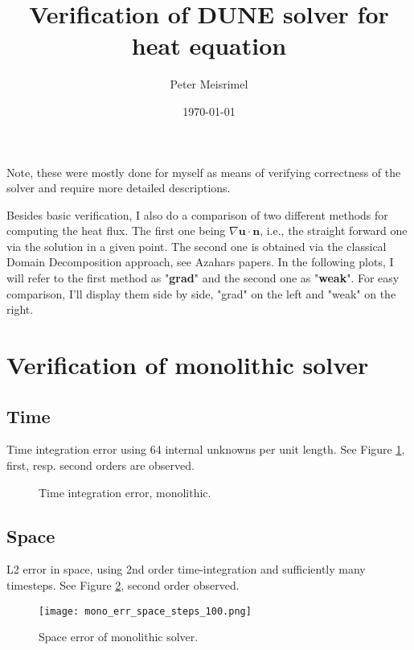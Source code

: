 \documentclass[a4paper,10pt]{article}
\title{Verification of DUNE solver for heat equation}
\author{Peter Meisrimel}
\date{\today}
\begin{document}
\maketitle
\tableofcontents
\newpage

Note, these were mostly done for myself as means of verifying correctness of the solver and require more detailed descriptions. 

Besides basic verification, I also do a comparison of two different methods for computing the heat flux. The first one being $\nabla \bm{u} \cdot \bm{n}$, i.e., the straight forward one via the solution in a given point. The second one is obtained via the classical Domain Decomposition approach, see Azahars papers. In the following plots, I will refer to the first method as "\textbf{grad}" and the second one as "\textbf{weak}". For easy comparison, I'll display them side by side, "grad" on the left and "weak" on the right.

\section{Verification of monolithic solver}
\FloatBarrier
\subsection{Time}
Time integration error using 64 internal unknowns per unit length. See Figure \ref{FIG MONO TIME}, first, resp. second orders are observed.

\begin{figure}[ht!]
\caption{Time integration error, monolithic.}
\label{FIG MONO TIME}
\end{figure}
% 
\FloatBarrier
\subsection{Space}
L2 error in space, using 2nd order time-integration and sufficiently many timesteps. See Figure \ref{FIG MONO SPACE}, second order observed.

\begin{figure}[ht!]
\begin{center}
\texttt{[image: mono\_err\_space\_steps\_100.png]}
\caption{Space error of monolithic solver.}
\label{FIG MONO SPACE}
\end{center}
\end{figure}
% 
\FloatBarrier
\end{document}
